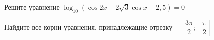 \begin{ex}
	\begin{condition}
		\begin{enumcols}[label=\asbuk*)]
			\item Решите уравнение \( \log_{10} (\cos 2x - 2\sqrt{3}\cos x - 2,5) = 0 \)
			\item Найдите все корни уравнения, принадлежащие отрезку \( \left[-\dfrac{3\pi}{2};-\dfrac{\pi}{2}\right] \)
		\end{enumcols}
	\end{condition}
\end{ex}
